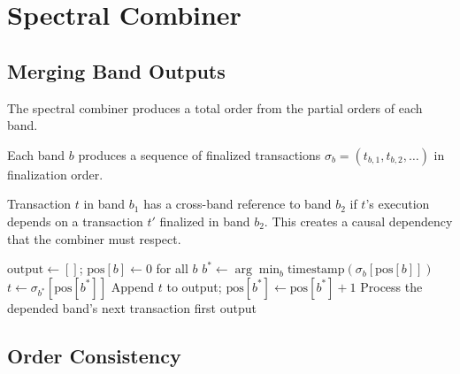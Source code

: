 \section{Spectral Combiner}

\label{sec:prism-combiner}

\subsection{Merging Band Outputs}

The spectral combiner produces a total order from the partial orders of each band.

\begin{definition}
Each band $b$ produces a sequence of finalized transactions $\sigma_b = (t_{b,1}, t_{b,2}, \ldots)$
in finalization order.
\end{definition}

\begin{definition}
Transaction $t$ in band $b_1$ has a cross-band reference to band $b_2$ if $t$'s
execution depends on a transaction $t'$ finalized in band $b_2$. This creates a
causal dependency that the combiner must respect.
\end{definition}

\begin{algorithm}[H]
\caption{Spectral Combiner --- Deterministic Merge}
\label{alg:prism-combiner}
\begin{algorithmic}[1]
    \State $\text{output} \gets []$; $\text{pos}[b] \gets 0$ for all $b$
        \State {}
        \State $b^* \gets \arg\min_b \text{timestamp}(\sigma_b[\text{pos}[b]])$
        \State $t \gets \sigma_{b^*}[\text{pos}[b^*]]$
        \State {}
            \State Append $t$ to output; $\text{pos}[b^*] \gets \text{pos}[b^*] + 1$
        \Else
            \State {}
            \State Process the depended band's next transaction first
        \EndIf
    \EndWhile
    \State \Return output
\EndFunction
\end{algorithmic}
\end{algorithm}

\subsection{Order Consistency}

